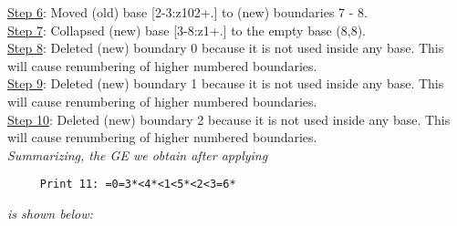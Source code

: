 \documentclass[final]{article}
\begin{document}
{\underline{Step 6}:} Moved (old) base [2-3:z102+.]  to (new) boundaries 7 - 8.\\
{\underline{Step 7}:} Collapsed (new) base [3-8:z1+.]  to the empty base (8,8).
\\
{\underline{Step 8}:} Deleted (new) boundary 0 because it is not used inside any base.  This will cause renumbering of higher numbered boundaries.
\\
{\underline{Step 9}:} Deleted (new) boundary 1 because it is not used inside any base.  This will cause renumbering of higher numbered boundaries.
\\
{\underline{Step 10}:} Deleted (new) boundary 2 because it is not used inside any base.  This will cause renumbering of higher numbered boundaries.
\\[0.1in]
{\em Summarizing, the GE we obtain after applying}
\begin{verbatim}
     Print 11: =0=3*<4*<1<5*<2<3=6*
\end{verbatim}
{\em is shown below:}
\end{document}
